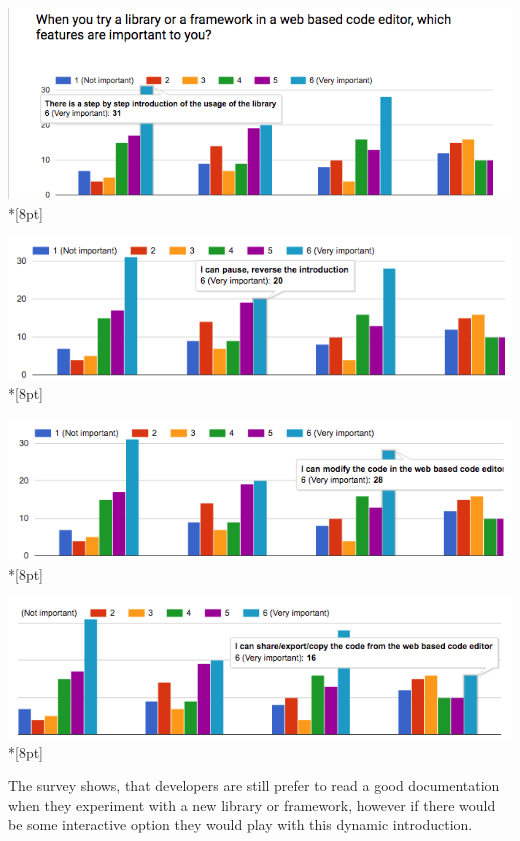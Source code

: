 \documentclass[12pt, a4paper, oneside, openright, medskipamount]{report}
\begin{document}
\includegraphics[width=1\textwidth]{assets/survey-result/features-stepbystep.png}\\*[8pt]

\includegraphics[width=1\textwidth]{assets/survey-result/features-paused.png}\\*[8pt]

\includegraphics[width=1\textwidth]{assets/survey-result/features-modify-code.png}\\*[8pt]

\includegraphics[width=1\textwidth]{assets/survey-result/features-sharing.png}\\*[8pt]

The survey shows, that developers are still prefer to read a good documentation when they experiment with a new library or framework, however if there would be some interactive option they would play with this dynamic introduction.
\end{document}

